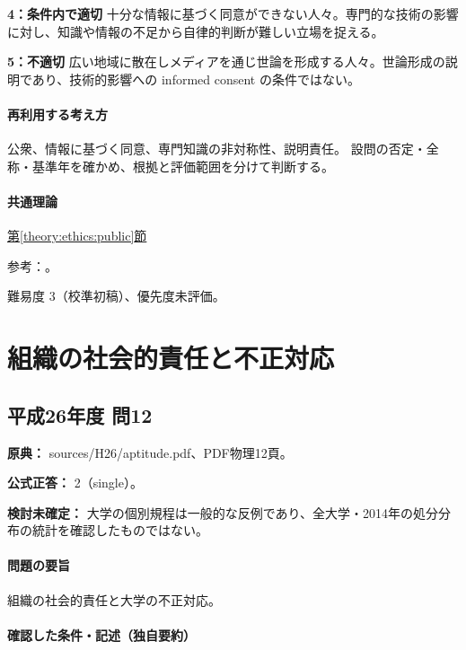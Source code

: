 \noindent\textbf{4：条件内で適切} 十分な情報に基づく同意ができない人々。専門的な技術の影響に対し、知識や情報の不足から自律的判断が難しい立場を捉える。\par

\noindent\textbf{5：不適切} 広い地域に散在しメディアを通じ世論を形成する人々。世論形成の説明であり、技術的影響への informed consent の条件ではない。\par

\paragraph{再利用する考え方} 公衆、情報に基づく同意、専門知識の非対称性、説明責任。 設問の否定・全称・基準年を確かめ、根拠と評価範囲を分けて判断する。

\paragraph{共通理論} \hyperref[theory:ethics:public]{第\ref*{theory:ethics:public}節}

\par 参考：\cite{scu_ethics_framework,ipej_ethics2011}。

\par 難易度 3（校準初稿）、優先度未評価。

\section{組織の社会的責任と不正対応}

\subsection{平成26年度 問12}
\label{q:h26-reg-apt-12}

\noindent\textbf{原典：} sources/H26/aptitude.pdf、PDF物理12頁。

\textbf{公式正答：} 2（single）。

\par\textbf{検討未確定：} 大学の個別規程は一般的な反例であり、全大学・2014年の処分分布の統計を確認したものではない。

\paragraph{問題の要旨} 組織の社会的責任と大学の不正対応。

\paragraph{確認した条件・記述（独自要約）}\mbox{}\par

